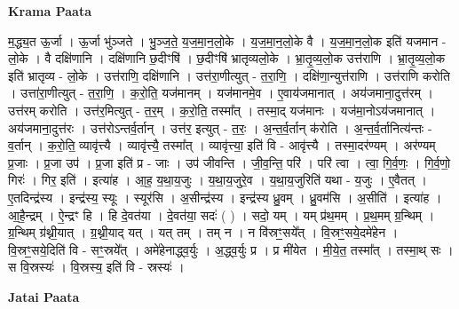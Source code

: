 \documentclass[17pt]{extarticle}
\begin{document}
\textbf{Krama Paata} \newline

म॒द्ध्य॒त ऊ॒र्जा । ऊ॒र्जा भु॑ञ्जते । भु॒ञ्ज॒ते॒ य॒ज॒मा॒न॒लो॒के । य॒ज॒मा॒न॒लो॒के वै । य॒ज॒मा॒न॒लो॒क इति॑ यजमान - लो॒के । वै दक्षि॑णानि । दक्षि॑णानि छ॒दीꣳषि॑ । छ॒दीꣳषि॑ भ्रातृव्यलो॒के । भ्रा॒तृ॒व्य॒लो॒क उत्त॑राणि । भ्रा॒तृ॒व्य॒लो॒क इति॑ भ्रातृव्य - लो॒के । उत्त॑राणि॒ दक्षि॑णानि । उत्त॑रा॒णीत्युत् - त॒रा॒णि॒ । दक्षि॑णा॒न्युत्त॑राणि । उत्त॑राणि करोति । उत्ता॑रा॒णीत्युत् - त॒रा॒णि॒ । क॒रो॒ति॒ यज॑मानम् । यज॑मानमे॒व । ए॒वाय॑जमानात् । अय॑जमाना॒दुत्त॑रम् । उत्त॑रम् करोति । उत्त॑र॒मित्युत् - त॒र॒म् । क॒रो॒ति॒ तस्मा᳚त् । तस्मा॒द् यज॑मानः । यज॑मा॒नोऽय॑जमानात् । अय॑जमाना॒दुत्त॑रः । उत्त॑रोऽन्तर्व॒र्तान् । उत्त॑र॒ इत्युत् - त॒रः॒ । अ॒न्त॒र्व॒र्तान् क॑रोति । अ॒न्त॒र्व॒र्तानित्य॑न्तः - व॒र्तान् । क॒रो॒ति॒ व्यावृ॑त्त्यै । व्यावृ॑त्त्यै॒ तस्मा᳚त् । व्यावृ॑त्त्या॒ इति॑ वि - आवृ॑त्त्यै । तस्मा॒दर॑ण्यम् । अर॑ण्यम् प्र॒जाः । प्र॒जा उप॑ । प्र॒जा इति॑ प्र - जाः । उप॑ जीवन्ति । जी॒व॒न्ति॒ परि॑ । परि॑ त्वा । त्वा॒ गि॒र्व॒णः॒ । गि॒र्व॒णो॒ गिरः॑ । गिर॒ इति॑ । इत्या॑ह । आ॒ह॒ य॒था॒य॒जुः । य॒था॒य॒जुरे॒व । य॒था॒य॒जुरिति॑ यथा - य॒जुः । ए॒वैतत् । ए॒तदिन्द्र॑स्य । इन्द्र॑स्य॒ स्यूः । स्यूर॑सि । अ॒सीन्द्र॑स्य । इन्द्र॑स्य ध्रु॒वम् । ध्रु॒वम॑सि । अ॒सीति॑ । इत्या॑ह । आ॒है॒न्द्रम् । ऐ॒न्द्रꣳ हि । हि दे॒वत॑या । दे॒वत॑या॒ सदः॑ ( ) । सदो॒ यम् । यम् प्र॑थ॒मम् । प्र॒थ॒मम् ग्र॒न्थिम् । ग्र॒न्थिम् ग्र॑थ्नी॒यात् । ग्र॒थ्नी॒याद् यत् । यत् तम् । तम् न । न वि॑स्रꣳ॒॒सये᳚त् । वि॒स्रꣳ॒॒सये॒दमे॑हेन । वि॒स्रꣳ॒॒सये॒दिति॑ वि - सꣳ॒॒स्रये᳚त् । अमे॑हेनाद्ध्व॒र्युः । अ॒द्ध्व॒र्युः प्र । प्र मी॑येत । मी॒ये॒त॒ तस्मा᳚त् । तस्मा॒थ् सः । स वि॒स्रस्यः॑ । वि॒स्रस्य॒ इति॑ वि - स्रस्यः॑ । \newline

\textbf{Jatai Paata} \newline
\end{document}
